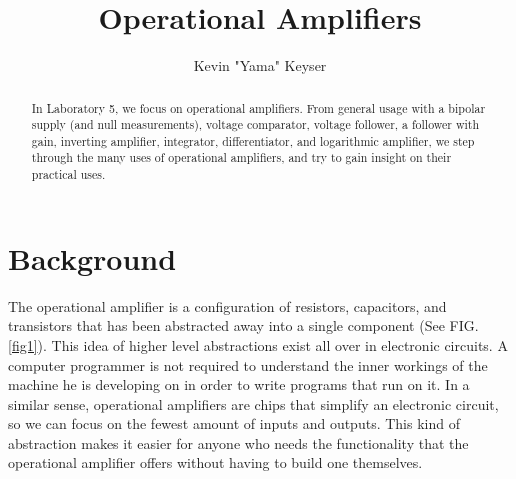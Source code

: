 \documentclass[%
 aip,
 jmp,
 amsmath,
 amssymb,
 reprint,%
 numerical,
 longbibliography,
]{revtex4-1}
\begin{document}

\title[Laboratory 5]{Operational Amplifiers} %

\author{Kevin "Yama" Keyser}
%


\begin{abstract}
In Laboratory 5, we focus on operational amplifiers.
From general usage with a bipolar supply (and null measurements), voltage comparator, voltage follower,
a follower with gain, inverting amplifier, integrator, differentiator, and logarithmic amplifier, we step
through the many uses of operational amplifiers, and try to gain insight on their practical uses.
\end{abstract}

\maketitle

%

\section{Background}

The operational amplifier is a configuration of resistors, capacitors, and transistors that has been abstracted
away into a single component (See FIG. \ref{fig1}). This idea of higher level abstractions exist all over in electronic circuits.
A computer programmer is not required to understand the inner workings of the machine he is developing on in order
to write programs that run on it. In a similar sense, operational amplifiers are chips that simplify an electronic
circuit, so we can focus on the fewest amount of inputs and outputs. This kind of abstraction makes it easier for 
anyone who needs the functionality that the operational amplifier offers without having to build one themselves.
\end{document}
